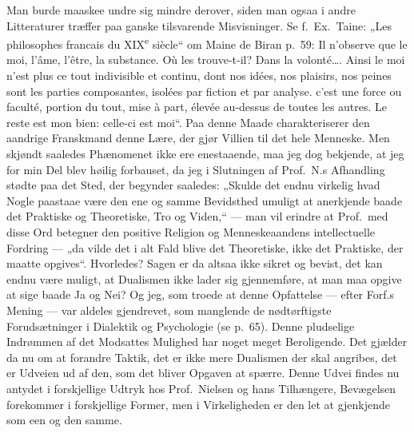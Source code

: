 Man burde maaskee undre sig mindre derover, siden man ogsaa i andre
Litteraturer træffer paa ganske tilsvarende Misvisninger. Se f.\ Ex.\ Taine:
„Les philosophes francais du XIX\textsuperscript{e} siècle“ om Maine de Biran
p.\ 59: Il n'observe que le moi, l'âme, l'être, la substance. Où les
trouve-t-il? Dans la volonté\dots. Ainsi le moi n'est plus ce tout indivisible
et continu, dont nos idées, nos plaisirs, nos peines sont les parties
composantes, isolées par fiction et par analyse. c'est une force ou faculté,
portion du tout, mise à part, élevée au-dessus de toutes les autres. Le reste
est mon bien: celle-ci est moi“. Paa denne Maade charakteriserer den aandrige
Franskmand denne Lære, der gjør
Villien til det hele Menneske. Men skjøndt saaledes Phænomenet ikke
ere enestaaende, maa jeg dog bekjende, at jeg for min Del blev høilig
forbauset, da jeg i Slutningen af Prof.\ N.s Afhandling stødte paa det Sted,
der begynder saaledes: „Skulde det endnu virkelig hvad Nogle paastaae være den
ene og samme Bevidsthed umuligt at anerkjende baade det Praktiske og
Theoretiske, Tro og Viden,“ --- man vil erindre at Prof.\ med disse Ord
betegner den positive Religion og Menneskeaandens intellectuelle Fordring ---
„da vilde det i alt Fald blive det Theoretiske, ikke det Praktiske, der maatte
opgives“. Hvorledes? Sagen er da altsaa ikke sikret og bevist, det kan endnu
være muligt, at Dualismen ikke lader sig gjennemføre, at man maa opgive at
sige baade Ja og Nei? Og jeg, som troede at denne Opfattelse --- efter Forf.s
Mening --- var aldeles gjendrevet, som manglende de nødtørftigste
Forudsætninger i Dialektik og Psychologie (se p.\ 65). Denne pludselige
Indrømmen af det Modsattes Mulighed har noget meget Beroligende. Det gjælder
da nu om at forandre Taktik, det er ikke mere Dualismen der skal angribes, det
er Udveien ud af den, som det bliver Opgaven at spærre. Denne Udvei findes nu
antydet i forskjellige Udtryk hos Prof.\ Nielsen og hans Tilhængere,
Bevægelsen forekommer i forskjellige Former, men i Virkeligheden er den let at
gjenkjende som een og den samme.

